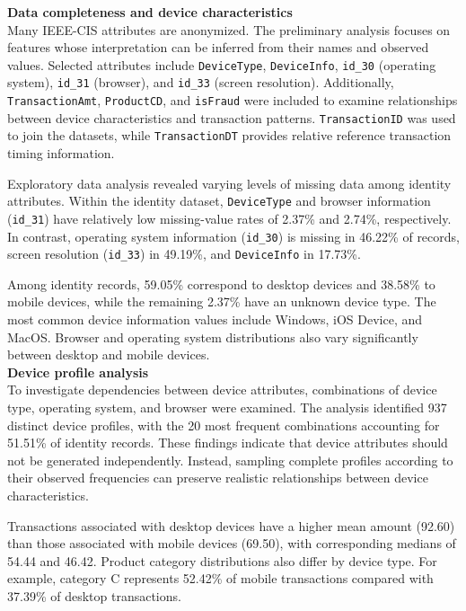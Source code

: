 \documentclass[titlepage]{article}
\begin{document}
\noindent \textbf{Data completeness and device characteristics}\\
Many IEEE-CIS attributes are anonymized. The preliminary analysis focuses on features whose interpretation can be inferred from their names and observed values. Selected attributes include \texttt{DeviceType}, \texttt{DeviceInfo}, \texttt{id\_30} (operating system), \texttt{id\_31} (browser), and \texttt{id\_33} (screen resolution). Additionally, \texttt{TransactionAmt}, \texttt{ProductCD}, and \texttt{isFraud} were included to examine relationships between device characteristics and transaction patterns. \texttt{TransactionID} was used to join the datasets, while \texttt{TransactionDT} provides relative reference transaction timing information.

Exploratory data analysis revealed varying levels of missing data among identity attributes. Within the identity dataset, \texttt{DeviceType} and browser information (\texttt{id\_31}) have relatively low missing-value rates of 2.37\% and 2.74\%, respectively. In contrast, operating system information (\texttt{id\_30}) is missing in 46.22\% of records, screen resolution (\texttt{id\_33}) in 49.19\%, and \texttt{DeviceInfo} in 17.73\%.

Among identity records, 59.05\% correspond to desktop devices and 38.58\% to mobile devices, while the remaining 2.37\% have an unknown device type. The most common device information values include Windows, iOS Device, and MacOS. Browser and operating system distributions also vary significantly between desktop and mobile devices. \\

\noindent \textbf{Device profile analysis}\\
To investigate dependencies between device attributes, combinations of device type, operating system, and browser were examined. The analysis identified 937 distinct device profiles, with the 20 most frequent combinations accounting for 51.51\% of identity records. These findings indicate that device attributes should not be generated independently. Instead, sampling complete profiles according to their observed frequencies can preserve realistic relationships between device characteristics.

Transactions associated with desktop devices have a higher mean amount (92.60) than those associated with mobile devices (69.50), with corresponding medians of 54.44 and 46.42. Product category distributions also differ by device type. For example, category C represents 52.42\% of mobile transactions compared with 37.39\% of desktop transactions. \\
\end{document}
